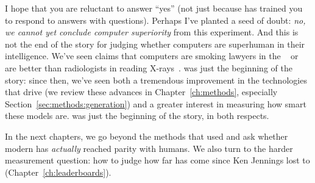 I hope that you are reluctant to answer ``yes'' (not just
because \jeopardy{} has trained you to respond to answers with
questions).
%
Perhaps I've planted a seed of doubt: \emph{no, we cannot yet conclude
  computer superiority} from this experiment.
%
And this is not the end of the story for judging whether computers are
superhuman in their intelligence.
%
We've seen claims that computers are smoking lawyers in the
~\citep{malik-24} or are better than radiologists in reading X-rays~\citep{bellamy-22}.
%
\watson{} was just the beginning of the story: since then, we've seen both a
tremendous improvement in the technologies that drive  (we review
these advances in Chapter~\ref{ch:methods}, especially
Section~\ref{sec:methods:generation}) and a greater interest in
measuring how smart these models are.
%
\watson{} was just the beginning of the story, in both respects.


In the next chapters, we go beyond the methods that \watson{} used and
ask whether modern  has \emph{actually} reached parity with
humans.
%
We also turn to the harder measurement question: how to judge how far
 has come since Ken Jennings lost to \watson{}
(Chapter~\ref{ch:leaderboards}).
